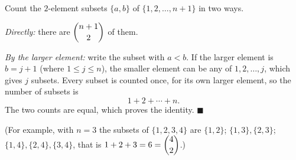 Count the $2$-element subsets $\{a,b\}$ of $\{1,2,\dots,n+1\}$ in two ways.

\emph{Directly:} there are $\dbinom{n+1}{2}$ of them.

\emph{By the larger element:} write the subset with $a<b$. If the larger element is $b=j+1$ (where $1\le j\le n$), the smaller element can be any of $1,2,\dots,j$, which gives $j$ subsets. Every subset is counted once, for its own larger element, so the number of subsets is
\[1+2+\cdots+n.\]
The two counts are equal, which proves the identity. $\blacksquare$

(For example, with $n=3$ the subsets of $\{1,2,3,4\}$ are $\{1,2\}$; $\{1,3\},\{2,3\}$; $\{1,4\},\{2,4\},\{3,4\}$, that is $1+2+3=6=\dbinom42$.)

